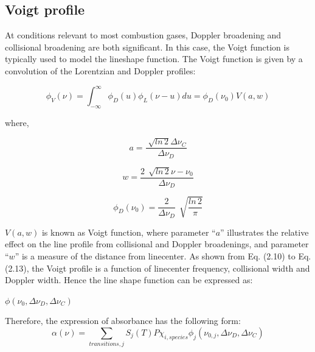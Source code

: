 \subsection{Voigt profile}
At conditions relevant to most combustion gases, Doppler broadening and collisional broadening are both significant. In this case, the Voigt function is typically used to model the lineshape function. The Voigt function is given by a convolution of the Lorentzian and Doppler profiles:

\begin{equation}\label{}
\phi_V(\nu)=\int_{-\infty}^{\infty}\phi_D(u)\phi_L(\nu-u)du=\phi_D(\nu_{0})V(a,w)
\end{equation}

where,

\begin{equation}\label{}
a=\frac{\sqrt[]{ln\,2}\Delta\nu_C}{\Delta\nu_D}
\end{equation}

\begin{equation}\label{}
w=\frac{2\,\sqrt[]{ln\,2}\nu-\nu_{0}}{\Delta\nu_D}
\end{equation}

\begin{equation}
\phi_D(\nu_{0})=\frac{2}{\Delta\nu_D}\,\sqrt[]{\frac{ln\,2}{\pi}}
\end{equation}

\vspace{3mm}

$V(a,w)$ is known as Voigt function, where parameter ``$a$'' illustrates the relative effect on the line profile from collisional and Doppler broadenings, and parameter ``$w$'' is a measure of the distance from linecenter. As shown from Eq. (2.10) to Eq. (2.13), the Voigt profile is a function of linecenter frequency, collisional width and Doppler width. Hence the line shape function can be expressed as:

\begin{center}
$\phi(\nu_{0},\Delta\nu_D,\Delta\nu_C)$
\end{center}

Therefore, the expression of absorbance has the following form:
\begin{equation}\label{}
\alpha(\nu)=\sum_{transitions, j}S_j(T)P\chi_{i,species}\phi_j(\nu_{0,j},\Delta\nu_D,\Delta\nu_C)
\end{equation}

